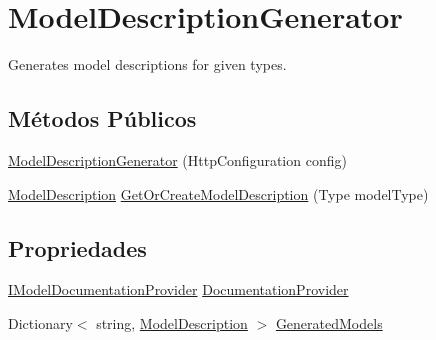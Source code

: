 \hypertarget{classApi3Layers_1_1Areas_1_1HelpPage_1_1ModelDescriptions_1_1ModelDescriptionGenerator}{}\section{Model\+Description\+Generator}
\label{classApi3Layers_1_1Areas_1_1HelpPage_1_1ModelDescriptions_1_1ModelDescriptionGenerator}


Generates model descriptions for given types.  


\subsection*{Métodos Públicos}
\begin{DoxyCompactItemize}
\item 
\hyperlink{classApi3Layers_1_1Areas_1_1HelpPage_1_1ModelDescriptions_1_1ModelDescriptionGenerator_a8bb9d53927e07e7e5a9e24cb692e52db}{Model\+Description\+Generator} (Http\+Configuration config)
\item 
\hyperlink{classApi3Layers_1_1Areas_1_1HelpPage_1_1ModelDescriptions_1_1ModelDescription}{Model\+Description} \hyperlink{classApi3Layers_1_1Areas_1_1HelpPage_1_1ModelDescriptions_1_1ModelDescriptionGenerator_ac19c99af386f86f13717a447e965f9d7}{Get\+Or\+Create\+Model\+Description} (Type model\+Type)
\end{DoxyCompactItemize}
\subsection*{Propriedades}
\begin{DoxyCompactItemize}
\item 
\hyperlink{interfaceApi3Layers_1_1Areas_1_1HelpPage_1_1ModelDescriptions_1_1IModelDocumentationProvider}{I\+Model\+Documentation\+Provider} \hyperlink{classApi3Layers_1_1Areas_1_1HelpPage_1_1ModelDescriptions_1_1ModelDescriptionGenerator_a4652be127f17b1d03648642fa509968c}{Documentation\+Provider}
\item 
Dictionary$<$ string, \hyperlink{classApi3Layers_1_1Areas_1_1HelpPage_1_1ModelDescriptions_1_1ModelDescription}{Model\+Description} $>$ \hyperlink{classApi3Layers_1_1Areas_1_1HelpPage_1_1ModelDescriptions_1_1ModelDescriptionGenerator_a3132a32205bd0f5029c2a01ab8c29e64}{Generated\+Models}
\end{DoxyCompactItemize}
